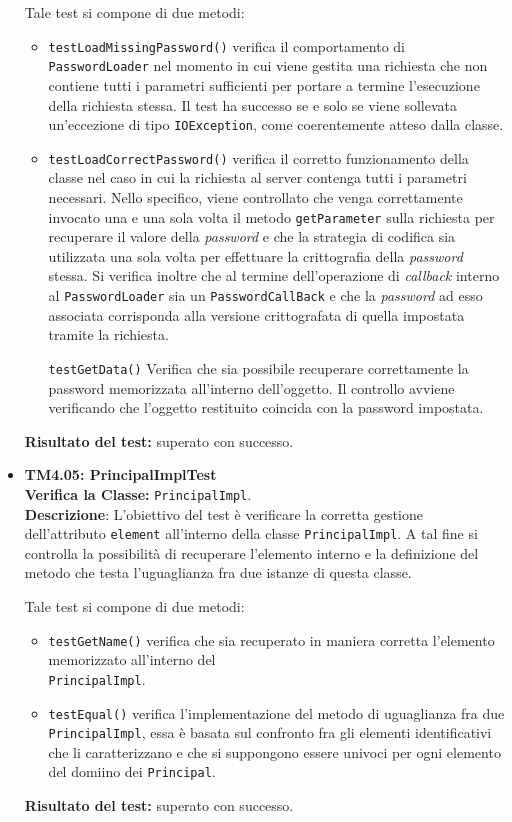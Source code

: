 \begin{itemize}
Tale test si compone di due metodi:
\begin{itemize}

\item \texttt{testLoadMissingPassword()} verifica il comportamento di \texttt{PasswordLoader} nel momento in cui viene gestita una richiesta che non contiene tutti i parametri sufficienti per portare a termine l'esecuzione della richiesta stessa. Il test ha successo se e solo se viene sollevata un'eccezione di tipo \texttt{IOException}, come coerentemente atteso dalla classe.

\item \texttt{testLoadCorrectPassword()} verifica il corretto funzionamento della classe nel caso in cui la richiesta al server contenga tutti i parametri necessari. Nello specifico, viene controllato che venga correttamente invocato una e una sola volta il metodo \texttt{getParameter} sulla richiesta per recuperare il valore della \textit{password} e che la strategia di codifica sia utilizzata una sola volta per effettuare la crittografia della \textit{password} stessa. Si verifica inoltre che al termine dell'operazione di \textit{callback} interno al \texttt{PasswordLoader} sia un \texttt{PasswordCallBack} e che la \textit{password} ad esso associata corrisponda alla versione crittografata di quella impostata tramite la richiesta.

\texttt{testGetData()} Verifica che sia possibile recuperare correttamente la password memorizzata all'interno dell'oggetto.
Il controllo avviene verificando che l'oggetto restituito coincida con la password impostata.
 
\end{itemize}
\textbf{Risultato del test:} superato con successo.


\item \textbf{TM4.05: PrincipalImplTest}\\
\textbf{Verifica la Classe:} \texttt{PrincipalImpl}.\\
\textbf{Descrizione}: L'obiettivo del test è verificare la corretta gestione dell'attributo \texttt{element} all'interno della classe \texttt{PrincipalImpl}. A tal fine si controlla la possibilità di recuperare l'elemento interno e la definizione del metodo che testa l'uguaglianza fra due istanze di questa classe.

Tale test si compone di due metodi:
\begin{itemize}
\item \texttt{testGetName()} verifica che sia recuperato in maniera corretta l'elemento memorizzato all'interno del\\ \texttt{PrincipalImpl}.

\item \texttt{testEqual()} verifica l'implementazione del metodo di uguaglianza fra due \\ \texttt{PrincipalImpl}, essa è basata sul confronto fra gli elementi identificativi che li caratterizzano e che si suppongono essere univoci per ogni elemento del domiino dei \texttt{Principal}.
\end{itemize}
\textbf{Risultato del test:} superato con successo.

\end{itemize}

